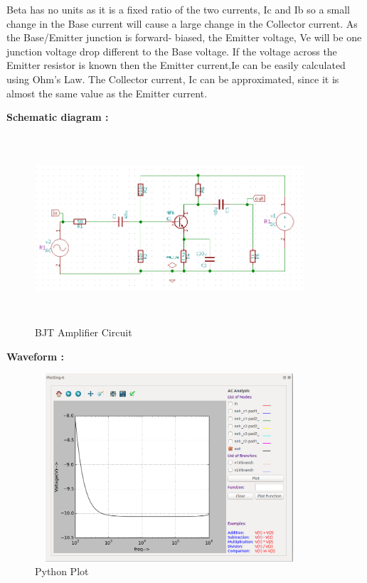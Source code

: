 \documentclass{article}
\begin{document}
Beta has no units as it is a fixed ratio of the two currents, Ic and Ib so a small change in the Base
current will cause a large change in the Collector current. As the Base/Emitter junction is forward-
biased, the Emitter voltage, Ve will be one junction voltage drop different to the Base voltage. If the
voltage across the Emitter resistor is known then the Emitter current,Ie can be easily calculated
using Ohm’s Law. The Collector current, Ic can be approximated, since it is almost the same value
as the Emitter current. \par
\textbf{Schematic diagram : }
\begin{figure}[!htp]
    \centering
    \includegraphics[width=10cm, height=7cm]{BJT_ckt.png}
    \caption{BJT Amplifier Circuit}
    \label{BJTCKT}
\end{figure}

\textbf{Waveform :}
\begin{figure}[!htp]
        \centering
        \includegraphics[width=10cm, height=7cm]{Python-plot-output.png}
        \caption{Python Plot}
        \label{Python-Plot}
\end{figure}
\end{document}
